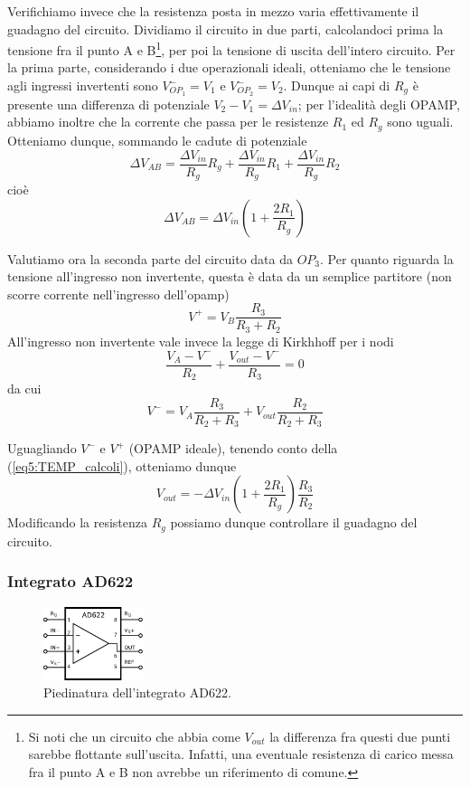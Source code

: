 Verifichiamo invece che la resistenza posta in mezzo varia effettivamente il guadagno del circuito. Dividiamo il circuito in due parti, calcolandoci prima la tensione fra il punto A e B\footnote{Si noti che un circuito che abbia come $V_{out}$ la differenza fra questi due punti sarebbe flottante sull'uscita. Infatti, una eventuale resistenza di carico messa fra il punto A e B non avrebbe un riferimento di comune.}, per poi la tensione di uscita dell'intero circuito. Per la prima parte, considerando i due operazionali ideali, otteniamo che le tensione agli ingressi invertenti sono $V_{OP_1}^- = V_1$ e $V_{OP_2}^- = V_2$. Dunque ai capi di $R_g$ è presente una differenza di potenziale $V_2-V_1 = \Delta V_{in}$; per l'idealità degli OPAMP, abbiamo inoltre che la corrente che passa per le resistenze $R_1$ ed $R_g$ sono uguali. Otteniamo dunque, sommando le cadute di potenziale
$$\Delta V_{AB} = \frac{\Delta V_{in}}{R_g} R_g + \frac{\Delta V_{in}}{R_g} R_1 + \frac{\Delta V_{in}}{R_g} R_2$$
cioè
\begin{equation}
\Delta V_{AB} = \Delta V_{in} \left(1+\frac{2R_1}{R_g}\right)
\label{eq5:TEMP_calcoli}
\end{equation}

Valutiamo ora la seconda parte del circuito data da $OP_3$. Per quanto riguarda la tensione all'ingresso non invertente, questa è data da un semplice partitore (non scorre corrente nell'ingresso dell'opamp)
$$V^+=V_B \frac{R_3}{R_3+R_2}$$
All'ingresso non invertente vale invece la legge di Kirkhhoff per i nodi
$$\frac{V_A-V^-}{R_2}+\frac{V_{out}-V^-}{R_3}=0$$
da cui
$$V^-=V_A \frac{R_3}{R_2+R_3} + V_{out} \frac{R_2}{R_2+R_3}$$

Uguagliando $V^-$ e $V^+$ (OPAMP ideale), tenendo conto della (\ref{eq5:TEMP_calcoli}), otteniamo dunque
$$V_{out}=-\Delta V_{in} \left(1+\frac{2R_1}{R_g}\right)\frac{R_3}{R_2}$$
Modificando la resistenza $R_g$ possiamo dunque controllare il guadagno del circuito.

\newpage
\subsubsection{Integrato AD622}

\begin{figure}
  \begin{center}
    \includegraphics[width=0.260\textwidth]{../E05/latex/AD622.pdf}
  \end{center}
  \caption{Piedinatura dell'integrato AD622.}
  \label{cir5:ad622_piedinatura}
\end{figure}

